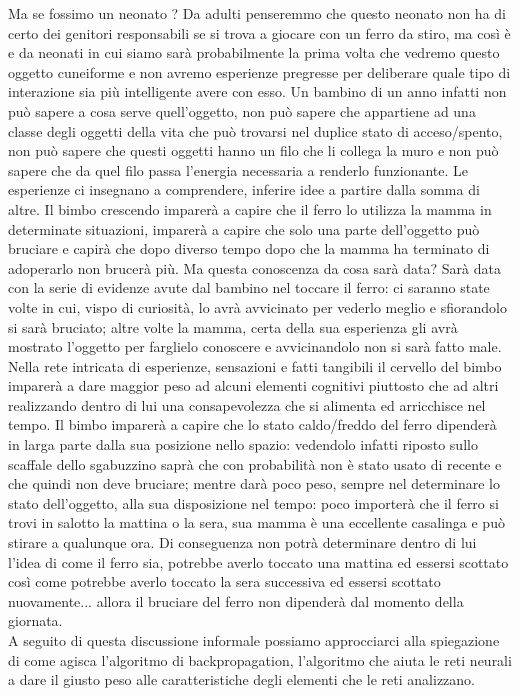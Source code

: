 Ma se fossimo un neonato ? Da adulti penseremmo che questo neonato non ha di certo dei genitori responsabili se si trova a giocare con un ferro da stiro, ma così è e da neonati in cui siamo sarà probabilmente la prima volta che vedremo questo oggetto cuneiforme e non avremo esperienze pregresse per deliberare quale tipo di interazione sia più intelligente avere con esso. Un bambino di un anno infatti non può sapere a cosa serve quell'oggetto, non può sapere che appartiene ad una classe degli oggetti della vita che può trovarsi nel duplice stato di acceso/spento, non può sapere che questi oggetti hanno un filo che li collega la muro e non può sapere che da quel filo passa l'energia necessaria a renderlo funzionante. Le esperienze ci insegnano a comprendere, inferire idee a partire dalla somma di altre. Il bimbo crescendo imparerà a capire che il ferro lo utilizza la mamma in determinate situazioni, imparerà a capire che solo una parte dell'oggetto può bruciare e capirà che dopo diverso tempo dopo che la mamma ha terminato di adoperarlo non brucerà più. Ma questa conoscenza da cosa sarà data? Sarà data con la serie di evidenze avute dal bambino nel toccare il ferro: ci saranno state volte in cui, vispo di curiosità, lo avrà avvicinato per vederlo meglio e sfiorandolo si sarà bruciato; altre volte la mamma, certa della sua esperienza gli avrà mostrato l'oggetto per farglielo conoscere e avvicinandolo non si sarà fatto male. Nella rete intricata di esperienze, sensazioni e fatti tangibili il cervello del bimbo imparerà a dare maggior peso ad alcuni elementi cognitivi piuttosto che ad altri realizzando dentro di lui una consapevolezza che si alimenta ed arricchisce nel tempo. Il bimbo imparerà a capire che lo stato caldo/freddo del ferro dipenderà in larga parte dalla sua posizione nello spazio: vedendolo infatti riposto sullo scaffale dello sgabuzzino saprà che con probabilità non è stato usato di recente e che quindi non deve bruciare; mentre darà poco peso, sempre nel determinare lo stato dell'oggetto, alla sua disposizione nel tempo: poco importerà che il ferro si trovi in salotto la mattina o la sera, sua mamma è una eccellente casalinga e può stirare a qualunque ora. Di conseguenza non potrà determinare dentro di lui l'idea di come il ferro sia, potrebbe averlo toccato una mattina ed essersi scottato così come potrebbe averlo toccato la sera successiva ed essersi scottato nuovamente... allora il bruciare del ferro non dipenderà dal momento della giornata. 
\\
A seguito di questa discussione informale possiamo approcciarci alla spiegazione di come agisca l'algoritmo di backpropagation, l'algoritmo che aiuta le reti neurali a dare il giusto peso alle caratteristiche degli elementi che le reti analizzano. 

